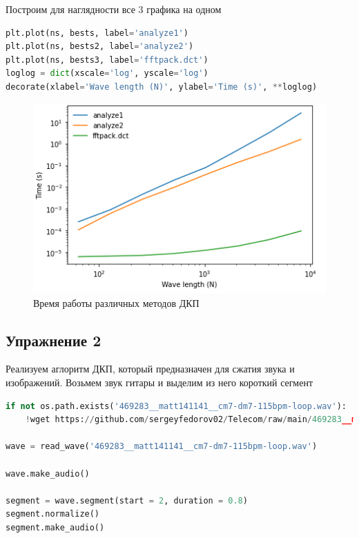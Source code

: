 Построим для наглядности все 3 графика на одном

\begin{lstlisting}[language=Python]
plt.plot(ns, bests, label='analyze1')
plt.plot(ns, bests2, label='analyze2')
plt.plot(ns, bests3, label='fftpack.dct')
loglog = dict(xscale='log', yscale='log')
decorate(xlabel='Wave length (N)', ylabel='Time (s)', **loglog)
\end{lstlisting}

\begin{figure}[H]
	\begin{center}
		\includegraphics[scale=1]{fig/lab06/lab06_04.png}
		\caption{Время работы различных методов ДКП}
	\end{center}
\end{figure}


\subsection{Упражнение 2}

Реализуем аглоритм ДКП, который предназначен для сжатия звука и изображений. Возьмем звук гитары и выделим из него короткий сегмент

\begin{lstlisting}[language=Python]
if not os.path.exists('469283__matt141141__cm7-dm7-115bpm-loop.wav'):
    !wget https://github.com/sergeyfedorov02/Telecom/raw/main/469283__matt141141__cm7-dm7-115bpm-loop.wav

wave = read_wave('469283__matt141141__cm7-dm7-115bpm-loop.wav')

wave.make_audio()

segment = wave.segment(start = 2, duration = 0.8)
segment.normalize()
segment.make_audio()
\end{lstlisting}

